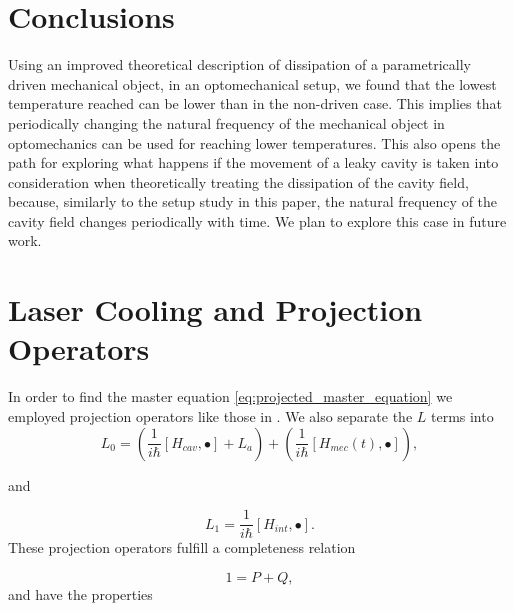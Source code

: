 \documentclass[reprint, amsmath,amssymb, aps,pra]{revtex4-1}
\begin{document}





\section{Conclusions}\label{ConCl}

Using an improved theoretical description of dissipation of a
parametrically driven mechanical object, in an optomechanical setup,
we found that the lowest temperature reached can be lower than in the
non-driven case. This implies that periodically changing the natural
frequency of the mechanical object in optomechanics can be used for
reaching lower temperatures. This also opens the path for exploring
what happens if the movement of a leaky cavity is taken into
consideration when theoretically treating the dissipation of the
cavity field, because, similarly to the setup study in this paper, the
natural frequency of the cavity field changes periodically with time.
We plan to explore this case in future work.
 
\appendix

\section{Laser Cooling and Projection Operators}\label{CoolingAppendix}

In order to find the master equation
\eqref{eq:projected_master_equation} we employed projection operators
like those in \cite{CarmichaelQO}. We also separate the $L$ terms into
\begin{equation}
L_0= (\frac{1}{i\hbar}[H_{cav},\bullet]+L_a) +(\frac{1}{i\hbar}[H_{mec}(t),\bullet]),
\end{equation}

and

\begin{equation}
L_1 = \frac{1}{i\hbar}[H_{int},\bullet].
\end{equation}These projection operators fulfill a completeness
relation

\begin{equation}
1 = P + Q,
\end{equation} and have the properties
\end{document}

